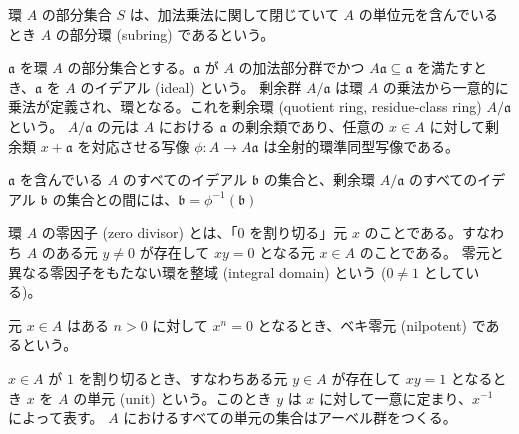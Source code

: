 \documentclass[uplatex,dvipdfmx,a4paper,11pt]{jlreq}
\theoremstyle{definition}
\begin{document}
\begin{definition}
  環 $A$ の部分集合 $S$ は、加法乗法に関して閉じていて $A$ の単位元を含んでいるとき $A$ の部分環 (subring) であるという。
\end{definition}

\begin{definition}[イデアル]
  $\mathfrak{a}$ を環 $A$ の部分集合とする。$\mathfrak{a}$ が $A$ の加法部分群でかつ $A\mathfrak{a}\subseteq\mathfrak{a}$ を満たすとき、$\mathfrak{a}$ を $A$ のイデアル (ideal) という。
  剰余群 $A/\mathfrak{a}$ は環 $A$ の乗法から一意的に乗法が定義され、環となる。これを剰余環 (quotient ring, residue-class ring) $A/\mathfrak{a}$ という。
  $A/\mathfrak{a}$ の元は $A$ における $\mathfrak{a}$ の剰余類であり、任意の $x\in A$ に対して剰余類 $x + \mathfrak{a}$ を対応させる写像 $\phi: A\to A\mathfrak{a}$ は全射的環準同型写像である。
\end{definition}

\begin{proposition}
  $\mathfrak{a}$ を含んでいる $A$ のすべてのイデアル $\mathfrak{b}$ の集合と、剰余環 $A/\mathfrak{a}$ のすべてのイデアル $\mathfrak{b}$ の集合との間には、$\mathfrak{b} = \phi^{-1}(\mathfrak{b})$
\end{proposition}

\begin{definition}[]
  環 $A$ の零因子 (zero divisor) とは、「$0$ を割り切る」元 $x$ のことである。すなわち $A$ のある元 $y \neq 0$ が存在して $xy = 0$ となる元 $x\in A$ のことである。
  零元と異なる零因子をもたない環を整域 (integral domain) という ($0 \neq 1$ としている)。

  元 $x\in A$ はある $n > 0$ に対して $x^n = 0$ となるとき、ベキ零元 (nilpotent) であるという。

  $x\in A$ が $1$ を割り切るとき、すなわちある元 $y\in A$ が存在して $xy = 1$ となるとき $x$ を $A$ の単元 (unit) という。このとき $y$ は $x$ に対して一意に定まり、$x^{-1}$ によって表す。
  $A$ におけるすべての単元の集合はアーベル群をつくる。
\end{definition}
\end{document}
